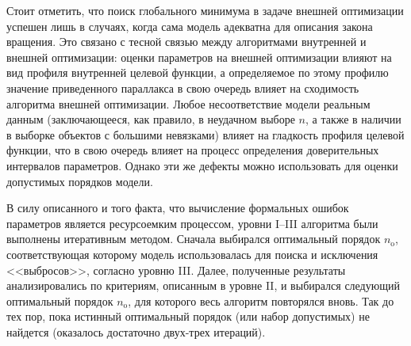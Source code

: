 \documentclass[a4paper, oneside, 14pt]{article}
\begin{document}
Стоит отметить, что поиск глобального минимума в задаче внешней оптимизации успешен лишь в случаях, когда сама модель адекватна для описания закона вращения. Это связано с тесной связью между алгоритмами внутренней и внешней оптимизации: оценки параметров на внешней оптимизации влияют на вид профиля внутренней целевой функции, а определяемое по этому профилю значение приведенного параллакса в свою очередь влияет на сходимость алгоритма внешней оптимизации. Любое несоответствие модели реальным данным (заключающееся, как правило, в неудачном выборе $ n $, а также в наличии в выборке объектов с большими невязками) влияет на гладкость профиля целевой функции, что в свою очередь влияет на процесс определения доверительных интервалов параметров. Однако эти же дефекты можно использовать для оценки допустимых порядков модели.

В силу описанного и того факта, что вычисление формальных ошибок параметров является ресурсоемким процессом, уровни I--III алгоритма были выполнены итеративным методом. Сначала выбирался оптимальный порядок $ n_\text{o} $, соответствующая которому модель использовалась для поиска и исключения <<выбросов>>, согласно уровню III. Далее, полученные результаты анализировались по критериям, описанным в уровне II, и выбирался следующий оптимальный порядок $ n_\text{o} $, для которого весь алгоритм повторялся вновь. Так до тех пор, пока истинный оптимальный порядок (или набор допустимых) не найдется (оказалось достаточно двух-трех итераций).

\clearpage
\end{document}
